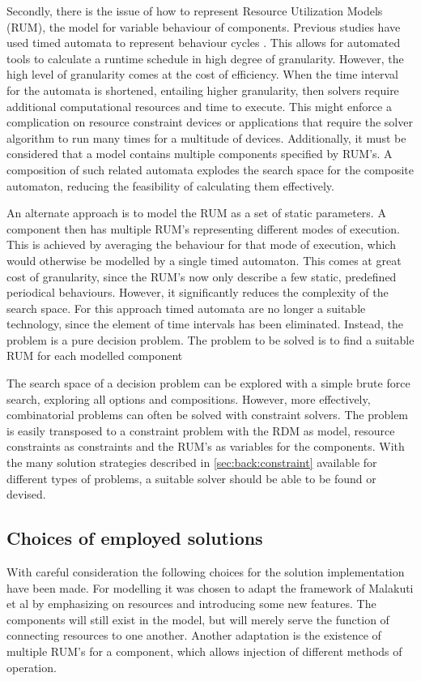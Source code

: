 Secondly, there is the issue of how to represent Resource Utilization Models (RUM), the model for variable behaviour of components. Previous studies have used timed automata to represent behaviour cycles \cite{rum_basis_89, steven_te_brinke}. This allows for automated tools to calculate a runtime schedule in high degree of granularity. However, the high level of granularity comes at the cost of efficiency. When the time interval for the automata is shortened, entailing higher granularity, then solvers require additional computational resources and time to execute. This might enforce a complication on resource constraint devices or applications that require the solver algorithm to run many times for a multitude of devices. Additionally, it must be considered that a model contains multiple components specified by RUM's. A composition of such related automata explodes the search space for the composite automaton, reducing the feasibility of calculating them effectively.

An alternate approach is to model the RUM as a set of static parameters. A component then has multiple RUM's representing different modes of execution. This is achieved by averaging the behaviour for that mode of execution, which would otherwise be modelled by a single timed automaton. This comes at great cost of granularity, since the RUM's now only describe a few static, predefined periodical behaviours. However, it significantly reduces the complexity of the search space. For this approach timed automata are no longer a suitable technology, since the element of time intervals has been eliminated. Instead, the problem is a pure decision problem. The problem to be solved is to find a suitable RUM for each modelled component

The search space of a decision problem can be explored with a simple brute force search, exploring all options and compositions. However, more effectively, combinatorial problems can often be solved with constraint solvers. The problem is easily transposed to a constraint problem with the RDM as model, resource constraints as constraints and the RUM's as variables for the components. With the many solution strategies described in \ref{sec:back:constraint} available for different types of problems, a suitable solver should be able to be found or devised.

\subsection{Choices of employed solutions}
\label{sub:choices}
With careful consideration the following choices for the solution implementation have been made. For modelling it was chosen to adapt the framework of Malakuti et al \cite{steven_te_brinke} by emphasizing on resources and introducing some new features. The components will still exist in the model, but will merely serve the function of connecting resources to one another. Another adaptation is the existence of multiple RUM's for a component, which allows injection of different methods of operation.

